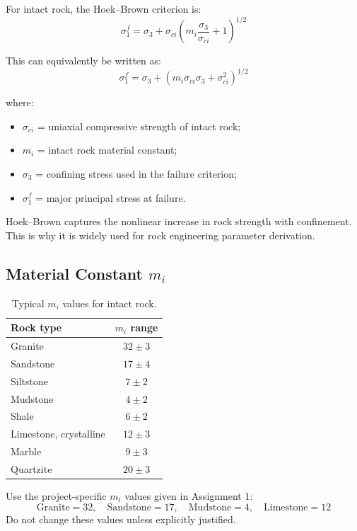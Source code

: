 \documentclass[a4paper,12pt]{article}
\begin{document}
For intact rock, the Hoek--Brown criterion is:
\[
\sigma_1^f =
\sigma_3 + \sigma_{ci}
\left(
m_i\frac{\sigma_3}{\sigma_{ci}} + 1
\right)^{1/2}
\]

This can equivalently be written as:
\[
\sigma_1^f =
\sigma_3 +
\left(
m_i\sigma_{ci}\sigma_3 + \sigma_{ci}^{2}
\right)^{1/2}
\]

where:
\begin{itemize}
    \item \(\sigma_{ci}\) = uniaxial compressive strength of intact rock;
    \item \(m_i\) = intact rock material constant;
    \item \(\sigma_3\) = confining stress used in the failure criterion;
    \item \(\sigma_1^f\) = major principal stress at failure.
\end{itemize}

\begin{keybox}
Hoek--Brown captures the nonlinear increase in rock strength with confinement. This is
why it is widely used for rock engineering parameter derivation.
\end{keybox}

\subsection{Material Constant \(m_i\)}

\begin{table}[H]
\centering
\small
\begin{tabularx}{0.75\textwidth}{l c}
\toprule
\textbf{Rock type} & \textbf{\(m_i\) range} \\
\midrule
Granite & \(32 \pm 3\) \\
Sandstone & \(17 \pm 4\) \\
Siltstone & \(7 \pm 2\) \\
Mudstone & \(4 \pm 2\) \\
Shale & \(6 \pm 2\) \\
Limestone, crystalline & \(12 \pm 3\) \\
Marble & \(9 \pm 3\) \\
Quartzite & \(20 \pm 3\) \\
\bottomrule
\end{tabularx}
\caption{Typical \(m_i\) values for intact rock.}
\end{table}

\begin{notebox}
Use the project-specific \(m_i\) values given in Assignment 1:
\[
\text{Granite}=32,\quad
\text{Sandstone}=17,\quad
\text{Mudstone}=4,\quad
\text{Limestone}=12
\]
Do not change these values unless explicitly justified.
\end{notebox}
\end{document}
